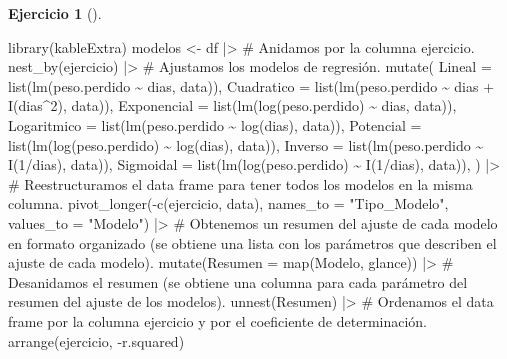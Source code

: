 \documentclass[
  a4paper,
]{scrreport}
\newenvironment{Shaded}{\begin{snugshade}}{\end{snugshade}}
\newcommand{\AttributeTok}[1]{\textcolor[rgb]{0.40,0.45,0.13}{#1}}
\newcommand{\CommentTok}[1]{\textcolor[rgb]{0.37,0.37,0.37}{#1}}
\newcommand{\DecValTok}[1]{\textcolor[rgb]{0.68,0.00,0.00}{#1}}
\newcommand{\FunctionTok}[1]{\textcolor[rgb]{0.28,0.35,0.67}{#1}}
\newcommand{\NormalTok}[1]{\textcolor[rgb]{0.00,0.23,0.31}{#1}}
\newcommand{\OtherTok}[1]{\textcolor[rgb]{0.00,0.23,0.31}{#1}}
\newcommand{\SpecialCharTok}[1]{\textcolor[rgb]{0.37,0.37,0.37}{#1}}
\newcommand{\StringTok}[1]{\textcolor[rgb]{0.13,0.47,0.30}{#1}}
\theoremstyle{definition}
\newtheorem{exercise}{Ejercicio}[chapter]
\theoremstyle{remark}
\begin{document}
\begin{exercise}[]
\begin{enumerate}
\begin{tcolorbox}
\begin{Shaded}
\begin{Highlighting}[]
\FunctionTok{library}\NormalTok{(kableExtra)}
\NormalTok{modelos }\OtherTok{\textless{}{-}}\NormalTok{ df  }\SpecialCharTok{|\textgreater{}} 
    \CommentTok{\# Anidamos por la columna ejercicio.}
    \FunctionTok{nest\_by}\NormalTok{(ejercicio)  }\SpecialCharTok{|\textgreater{}} 
    \CommentTok{\# Ajustamos los modelos de regresión.}
    \FunctionTok{mutate}\NormalTok{(}
        \AttributeTok{Lineal =} \FunctionTok{list}\NormalTok{(}\FunctionTok{lm}\NormalTok{(peso.perdido }\SpecialCharTok{\textasciitilde{}}\NormalTok{ dias, data)),}
        \AttributeTok{Cuadratico =} \FunctionTok{list}\NormalTok{(}\FunctionTok{lm}\NormalTok{(peso.perdido }\SpecialCharTok{\textasciitilde{}}\NormalTok{ dias }\SpecialCharTok{+} \FunctionTok{I}\NormalTok{(dias}\SpecialCharTok{\^{}}\DecValTok{2}\NormalTok{), data)),}
        \AttributeTok{Exponencial =} \FunctionTok{list}\NormalTok{(}\FunctionTok{lm}\NormalTok{(}\FunctionTok{log}\NormalTok{(peso.perdido) }\SpecialCharTok{\textasciitilde{}}\NormalTok{ dias, data)),}
        \AttributeTok{Logaritmico =} \FunctionTok{list}\NormalTok{(}\FunctionTok{lm}\NormalTok{(peso.perdido }\SpecialCharTok{\textasciitilde{}} \FunctionTok{log}\NormalTok{(dias), data)),}
        \AttributeTok{Potencial =} \FunctionTok{list}\NormalTok{(}\FunctionTok{lm}\NormalTok{(}\FunctionTok{log}\NormalTok{(peso.perdido) }\SpecialCharTok{\textasciitilde{}} \FunctionTok{log}\NormalTok{(dias), data)),}
        \AttributeTok{Inverso =} \FunctionTok{list}\NormalTok{(}\FunctionTok{lm}\NormalTok{(peso.perdido }\SpecialCharTok{\textasciitilde{}} \FunctionTok{I}\NormalTok{(}\DecValTok{1}\SpecialCharTok{/}\NormalTok{dias), data)),}
        \AttributeTok{Sigmoidal =} \FunctionTok{list}\NormalTok{(}\FunctionTok{lm}\NormalTok{(}\FunctionTok{log}\NormalTok{(peso.perdido) }\SpecialCharTok{\textasciitilde{}} \FunctionTok{I}\NormalTok{(}\DecValTok{1}\SpecialCharTok{/}\NormalTok{dias), data)),}
\NormalTok{    )  }\SpecialCharTok{|\textgreater{}} 
    \CommentTok{\# Reestructuramos el data frame para tener todos los modelos en la misma columna.}
    \FunctionTok{pivot\_longer}\NormalTok{(}\SpecialCharTok{{-}}\FunctionTok{c}\NormalTok{(ejercicio, data), }\AttributeTok{names\_to =} \StringTok{"Tipo\_Modelo"}\NormalTok{, }\AttributeTok{values\_to =} \StringTok{"Modelo"}\NormalTok{)  }\SpecialCharTok{|\textgreater{}} 
    \CommentTok{\# Obtenemos un resumen del ajuste de cada modelo en formato organizado (se obtiene una lista con los parámetros que describen el ajuste de cada modelo).}
    \FunctionTok{mutate}\NormalTok{(}\AttributeTok{Resumen =} \FunctionTok{map}\NormalTok{(Modelo, glance)) }\SpecialCharTok{|\textgreater{}} 
    \CommentTok{\# Desanidamos el resumen (se obtiene una columna para cada parámetro del resumen del ajuste de los modelos).}
    \FunctionTok{unnest}\NormalTok{(Resumen)  }\SpecialCharTok{|\textgreater{}} 
    \CommentTok{\# Ordenamos el data frame por la columna ejercicio y por el coeficiente de determinación.}
    \FunctionTok{arrange}\NormalTok{(ejercicio, }\SpecialCharTok{{-}}\NormalTok{r.squared)}


\end{Highlighting}
\end{Shaded}
\end{tcolorbox}
\end{enumerate}
\end{exercise}
\end{document}
